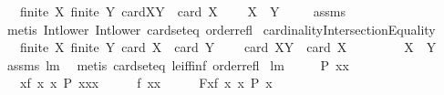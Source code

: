 \begin{isabellebody}
\ \ \ {\isachardoublequoteopen}finite\ X{\isachardoublequoteclose}\ {\isachardoublequoteopen}finite\ Y{\isachardoublequoteclose}\ {\isachardoublequoteopen}card{\isacharparenleft}X{\isasyminter}Y{\isacharparenright}\ {\isacharequal}\ card\ X{\isachardoublequoteclose}\ \isanewline
\ \ \ {\isachardoublequoteopen}X\ {\isasymsubseteq}\ Y{\isachardoublequoteclose}\ \isanewline
%
\isadelimproof
\ \ %
\endisadelimproof
%
\isatagproof
{}\isamarkupfalse%
\ assms\ \isamarkupfalse%
\ {\isacharparenleft}metis\ Int{\isacharunderscore}lower{}\ Int{\isacharunderscore}lower{}\ card{\isacharunderscore}seteq\ order{\isacharunderscore}refl{\isacharparenright}%
\endisatagproof
{\isafoldproof}%
%
\isadelimproof
\isanewline
%
\endisadelimproof
\isanewline
{}\isamarkupfalse%
\ cardinalityIntersectionEquality{\isacharcolon}\ \isanewline
\ \ \ {\isachardoublequoteopen}finite\ X{\isachardoublequoteclose}\ {\isachardoublequoteopen}finite\ Y{\isachardoublequoteclose}\ {\isachardoublequoteopen}card\ X\ {\isacharequal}\ card\ Y{\isachardoublequoteclose}\ \isanewline
\ \ \ {\isachardoublequoteopen}{\isacharparenleft}card\ {\isacharparenleft}X{\isasyminter}Y{\isacharparenright}\ {\isacharequal}\ card\ X{\isacharparenright}\ \ \ \ \ {\isacharequal}\ \ \ \ {\isacharparenleft}X\ {\isacharequal}\ Y{\isacharparenright}{\isachardoublequoteclose}\isanewline
%
\isadelimproof
\ \ %
\endisadelimproof
%
\isatagproof
{}\isamarkupfalse%
\ assms\ lm{}{}{}\ \isamarkupfalse%
\ {\isacharparenleft}metis\ card{\isacharunderscore}seteq\ le{\isacharunderscore}iff{\isacharunderscore}inf\ order{\isacharunderscore}refl{\isacharparenright}%
\endisatagproof
{\isafoldproof}%
%
\isadelimproof
\isanewline
%
\endisadelimproof
\isanewline
{}\isamarkupfalse%
\ lm{}{}{}{\isacharcolon}\ \ \isanewline
\ \ \ {\isachardoublequoteopen}P\ xx{\isachardoublequoteclose}\ \isanewline
\ \ \ {\isachardoublequoteopen}{\isacharbraceleft}{\isacharparenleft}x{\isacharcomma}f\ x{\isacharparenright}{\isacharbar}\ x{\isachardot}\ P\ x{\isacharbraceright}{\isacharcomma}{\isacharcomma}xx\ \ \ {\isacharequal}\ \ \ f\ xx{\isachardoublequoteclose}\isanewline
%
\isadelimproof
%
\endisadelimproof
%
\isatagproof
{}\isamarkupfalse%
\ {\isacharminus}\isanewline
\ \ \isamarkupfalse%
\ {\isacharquery}F{\isacharequal}{\isachardoublequoteopen}{\isacharbraceleft}{\isacharparenleft}x{\isacharcomma}f\ x{\isacharparenright}{\isacharbar}\ x{\isachardot}\ P\ x{\isacharbraceright}{\isachardoublequoteclose}\ \isamarkupfalse%

\end{isabellebody}
